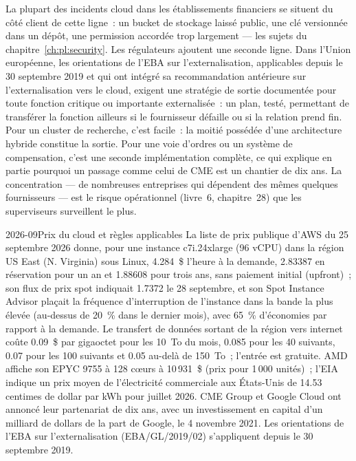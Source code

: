 La plupart des incidents cloud dans les établissements financiers se situent du côté client de cette ligne~: un bucket de stockage laissé public, une clé versionnée dans un dépôt,
une permission accordée trop largement --- les sujets du chapitre~\ref{ch:pl:security}. Les régulateurs ajoutent une seconde ligne. Dans l'Union européenne, les
orientations de l'EBA sur l'externalisation, applicables depuis le 30 septembre 2019 et qui ont intégré sa recommandation antérieure sur l'externalisation vers le cloud, exigent une
stratégie de sortie documentée pour toute fonction critique ou importante externalisée~: un plan, testé, permettant de transférer la fonction ailleurs si le fournisseur
défaille ou si la relation prend fin. Pour un cluster de recherche, c'est facile~: la moitié possédée d'une architecture hybride constitue la sortie. Pour une voie d'ordres ou un système de
compensation, c'est une seconde implémentation complète, ce qui explique en partie pourquoi un passage comme celui de CME est un chantier de dix ans. La concentration --- de nombreuses entreprises qui dépendent
des mêmes quelques fournisseurs --- est le risque opérationnel (livre~6, chapitre~28) que les superviseurs surveillent le plus.

\begin{dated}{2026-09}{Prix du cloud et règles applicables}\label{dat:pl:cloud-against-on-premises:prices}
La liste de prix publique d'AWS du 25 septembre 2026 donne, pour une instance c7i.24xlarge (96 vCPU) dans la région US East (N. Virginia) sous Linux, 4.284~\$
l'heure à la demande, 2.83387 en réservation pour un an et 1.88608 pour trois ans, sans paiement initial (upfront)~; son flux de prix spot indiquait 1.7372 le 28
septembre, et son Spot Instance Advisor plaçait la fréquence d'interruption de l'instance dans la bande la plus élevée (au-dessus de 20~\% dans le dernier mois), avec
65~\% d'économies par rapport à la demande. Le transfert de données sortant de la région vers internet coûte 0.09~\$ par gigaoctet pour les 10~To du mois, 0.085
pour les 40 suivants, 0.07 pour les 100 suivants et 0.05 au-delà de 150~To~; l'entrée est gratuite. AMD affiche son EPYC 9755 à 128 cœurs à 10\,931~\$ (prix
pour 1\,000 unités)~; l'EIA indique un prix moyen de l'électricité commerciale aux États-Unis de 14.53 centimes de dollar par kWh pour juillet 2026. CME Group et Google Cloud ont annoncé
leur partenariat de dix ans, avec un investissement en capital d'un milliard de dollars de la part de Google, le 4 novembre 2021. Les orientations de l'EBA sur l'externalisation
(EBA/GL/2019/02) s'appliquent depuis le 30 septembre 2019.
\end{dated}

